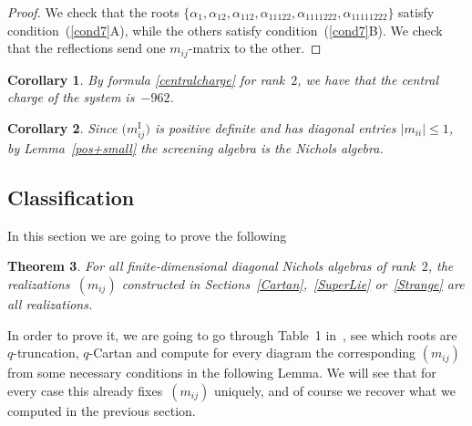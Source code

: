 \documentclass[10pt,a4paper]{amsart}
\numberwithin{equation}{section}
\newtheorem{teo}{Theorem}[section]
\newtheorem{cor}[teo]{Corollary}
\begin{document}
\begin{proof}
We check that the roots $\lbrace \alpha_1{,} \alpha_{12}{,} \alpha_{112}{,} \alpha_{11122}{,} \alpha_{1111222}{,} \alpha_{11111222} \rbrace$ satisfy condi\-tion~(\ref{cond7}A), while the others satisfy condition~(\ref{cond7}B). We check that the reflections send one $m_{ij}$-matrix to the other.
\end{proof}

\begin{cor}By formula \eqref{centralcharge} for rank~$2$, we have that the central charge of the system is~$-962$.
\end{cor}

\begin{cor}Since $\big(m_{ij}^{\mathrm{I}}\big)$ is positive definite and has diagonal entries $|m_{ii}|\leq 1$, by Lem\-ma~{\rm \ref{pos+small}} the screening algebra is the Nichols algebra.
\end{cor}

\subsection{Classification}\label{Classification}
In this section we are going to prove the following

\begin{teo}\label{classifthm}
For all finite-dimensional diagonal Nichols algebras of rank~$2$, the realiza\-tions~$(m_{ij})$ constructed in Sections~{\rm \ref{Cartan}},~{\rm \ref{SuperLie}} or~{\rm \ref{Strange}} are all realizations.
\end{teo}


In order to prove it, we are going to go through Table~1 in~\cite{Hecklist}, see which roots are $q$-truncation, $q$-Cartan and compute for every diagram the corresponding $(m_{ij})$ from some necessary conditions in the following Lemma. We will see that for every case this already fixes~$(m_{ij})$ uniquely, and of course we recover what we computed in the previous section.
\end{document}
